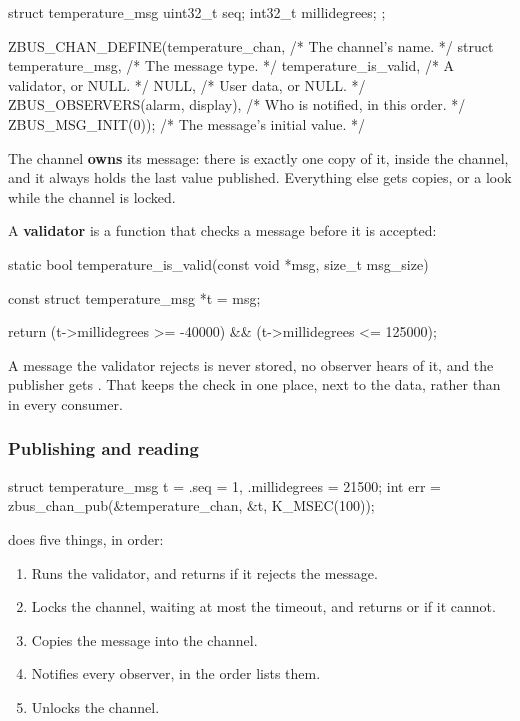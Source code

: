 \begin{ccode}
struct temperature_msg {
	uint32_t seq;
	int32_t millidegrees;
};

ZBUS_CHAN_DEFINE(temperature_chan,              /* The channel's name. */
		 struct temperature_msg,        /* The message type. */
		 temperature_is_valid,          /* A validator, or NULL. */
		 NULL,                          /* User data, or NULL. */
		 ZBUS_OBSERVERS(alarm, display), /* Who is notified, in this order. */
		 ZBUS_MSG_INIT(0));             /* The message's initial value. */
\end{ccode}

\noindent The channel \textbf{owns} its message: there is exactly one copy of it, inside the
channel, and it always holds the last value published. Everything else gets copies, or a look while
the channel is locked.

A \textbf{validator} is a function that checks a message before it is accepted:

\begin{ccode}
static bool temperature_is_valid(const void *msg, size_t msg_size)
{
	const struct temperature_msg *t = msg;

	return (t->millidegrees >= -40000) && (t->millidegrees <= 125000);
}
\end{ccode}

\noindent A message the validator rejects is never stored, no observer hears of it, and the
publisher gets . That keeps the check in one place, next to the data, rather than in
every consumer.

\subsubsection{Publishing and reading}
\begin{ccode}
struct temperature_msg t = {.seq = 1, .millidegrees = 21500};
int err = zbus_chan_pub(&temperature_chan, &t, K_MSEC(100));
\end{ccode}

\noindent {} does five things, in order:

\begin{enumerate}
  \item Runs the validator, and returns  if it rejects the message.
  \item Locks the channel, waiting at most the timeout, and returns  or  if it
    cannot.
  \item Copies the message into the channel.
  \item Notifies every observer, in the order  lists them.
  \item Unlocks the channel.
\end{enumerate}

